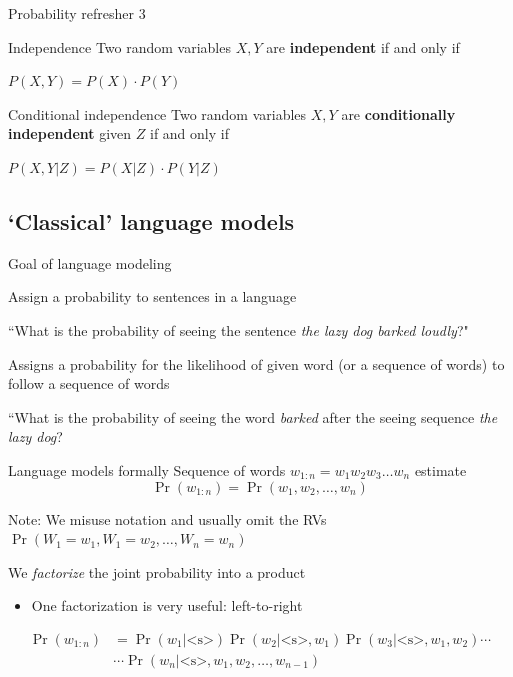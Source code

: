 \documentclass[12pt,aspectratio=169,handout]{beamer}
\begin{document}
\begin{frame}{Probability refresher 3}
	
	\begin{block}{Independence}
		Two random variables $X, Y$ are \textbf{independent} if and only if
		
		$P(X, Y) = P(X) \cdot P(Y)$
	\end{block}
	
	\pause
	
	\begin{block}{Conditional independence}
		Two random variables $X, Y$ are \textbf{conditionally independent} given $Z$ if and only if
		
		$P(X, Y | Z) = P(X|Z) \cdot P(Y|Z)$
	\end{block}
	
\end{frame}


\subsection{`Classical' language models}

\begin{frame}{Goal of language modeling}
	
	Assign a probability to sentences in a language
	
	\begin{example}
		``What is the probability of seeing the sentence \emph{the lazy dog barked loudly}?"
	\end{example}
	
	Assigns a probability for the likelihood of given word (or a sequence of words) to follow a sequence of words
	
	\begin{example}
		``What is the probability of seeing the word \emph{barked} after the seeing sequence \emph{the lazy dog}?
	\end{example}
	
\end{frame}

\begin{frame}{Language models formally}
	Sequence of words $w_{1:n} = w_1 w_2 w_3 \ldots w_n$ estimate
	$$
	\Pr(w_{1:n}) = \Pr(w_1, w_2, \ldots, w_n)
	$$
	\begin{block}{Note: We misuse notation and usually omit the RVs}
		$\Pr(W_1 = w_1, W_1 = w_2, \ldots, W_n = w_n)$
	\end{block}
	
	We \emph{factorize} the joint probability into a product
	\begin{itemize}
		\item One factorization is very useful: left-to-right
	\end{itemize}
	$$
	\begin{aligned}
	\Pr(w_{1:n}) &= \Pr(w_1 | \text{<s>}) \Pr (w_2 | \text{<s>}, w_1) \Pr(w_3 | \text{<s>}, w_1, w_2) \cdots\\
	&\cdots \Pr(w_n | \text{<s>}, w_1, w_2, \ldots, w_{n-1})
	\end{aligned}
	$$
	
\end{frame}
\end{document}
